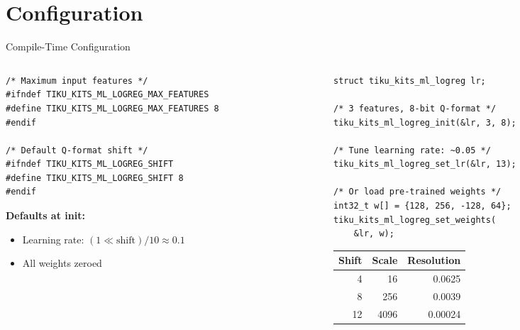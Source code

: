 \documentclass[aspectratio=169, 10pt]{beamer}
\begin{document}
\section{Configuration}

\begin{frame}[fragile]{Compile-Time Configuration}
\begin{columns}[T]
\begin{column}{0.48\textwidth}
\begin{lstlisting}[style=cstyle,
  title={Configurable parameters}]
/* Maximum input features */
#ifndef TIKU_KITS_ML_LOGREG_MAX_FEATURES
#define TIKU_KITS_ML_LOGREG_MAX_FEATURES 8
#endif

/* Default Q-format shift */
#ifndef TIKU_KITS_ML_LOGREG_SHIFT
#define TIKU_KITS_ML_LOGREG_SHIFT 8
#endif
\end{lstlisting}

\vspace{0.3em}
\textbf{Defaults at init:}
\begin{itemize}
  \item Learning rate: $(1 \ll \text{shift}) / 10 \approx 0.1$
  \item All weights zeroed
\end{itemize}
\end{column}

\begin{column}{0.48\textwidth}
\begin{lstlisting}[style=cstyle,
  title={Runtime configuration}]
struct tiku_kits_ml_logreg lr;

/* 3 features, 8-bit Q-format */
tiku_kits_ml_logreg_init(&lr, 3, 8);

/* Tune learning rate: ~0.05 */
tiku_kits_ml_logreg_set_lr(&lr, 13);

/* Or load pre-trained weights */
int32_t w[] = {128, 256, -128, 64};
tiku_kits_ml_logreg_set_weights(
    &lr, w);
\end{lstlisting}

\vspace{0.3em}
\begin{table}
\centering
\scriptsize
\begin{tabular}{@{}rrr@{}}
\toprule
\textbf{Shift} & \textbf{Scale} & \textbf{Resolution} \\
\midrule
4  & 16     & 0.0625 \\
8  & 256    & 0.0039 \\
12 & 4096   & 0.00024 \\
\bottomrule
\end{tabular}
\end{table}
\end{column}
\end{columns}
\end{frame}
\end{document}
